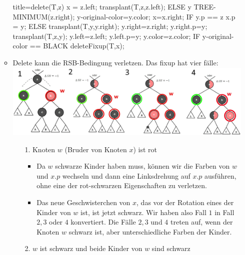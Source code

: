 \documentclass[
    12pt,
    a4paper,
    ngerman,
    color=3b,%
    marginpar=false,
    colorback=false,
    leqno,
]{tudaexercise}
\begin{document}
\begin{itemize}
\begin{itemize}
\begin{ccode}[autogobble,fontsize=\small]{title={delete(T,z)}}
                        x = z.left;
                        transplant(T,z,z.left);
                    ELSE
                        y TREE-MINIMUM(z.right);
                        y-original-color=y.color;
                        x=x.right;
                        IF y.p == z
                            x.p = y;
                        ELSE
                            transplant(T,y,y.right);
                            y.right=z.right;
                            y.right.p=y;
                        transplant(T,z,y);
                        y.left=z.left;
                        y.left.p=y;
                        y.color=z.color;
                    IF y-original-color == BLACK
                        deleteFixup(T,x);
                \end{ccode}
                \clearpage
                \item Delete kann die RSB-Bedingung verletzen. Das fixup hat vier fälle:\\
                \includegraphics[width=\textwidth-2cm]{pictures/deleteFixuoRBTCases.png}
                \begin{itemize}
                    \item[1.] Knoten $w$ (Bruder von Knoten $x$) ist rot
                    \begin{itemize}
                        \item Da $w$ schwarze Kinder haben muss, können wir die Farben von $w$ und $x.p$ wechseln und dann eine Linksdrehung auf $x.p$ ausführen, ohne eine der rot-schwarzen Eigenschaften zu verletzen.
                        \item Das neue Geschwisterchen von $x$, das vor der Rotation eines der Kinder von $w$ ist, ist jetzt schwarz. Wir haben also Fall $1$ in Fall $2, 3$ oder $4$ konvertiert.
                        Die Fälle $ 2, 3$ und $4$ treten auf, wenn der Knoten $w$ schwarz ist, aber unterschiedliche Farben der Kinder.
                    \end{itemize}
                    \item[2.] $w$ ist schwarz und beide Kinder von $w$ sind schwarz
                    \begin{itemize}

\end{itemize}
\end{itemize}
\end{itemize}
\end{itemize}
\end{document}
